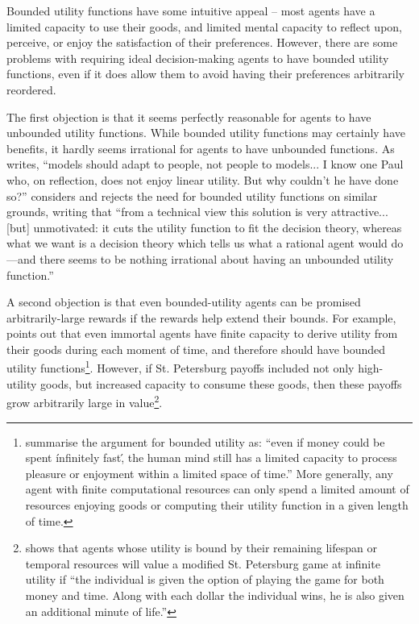 \documentclass{article}
\begin{document}
Bounded utility functions have some intuitive appeal -- most agents have a limited capacity to use their goods, and limited mental capacity to reflect upon, perceive, or enjoy the satisfaction of their preferences. However, there are some problems with requiring ideal decision-making agents to have bounded utility functions, even if it does allow them to avoid having their preferences arbitrarily reordered. 

The first objection is that it seems perfectly reasonable for agents to have unbounded utility functions. While bounded utility functions may certainly have benefits, it hardly seems irrational for agents to have unbounded functions. As \citep{samuelson1977st} writes, ``models should adapt to people, not people to models... I know one Paul who, on reflection, does not enjoy linear utility. But why couldn't he have done so?'' \citep{smith2014evaluative} considers and rejects the need for bounded utility functions on similar grounds, writing that ``from a technical view this solution is very attractive... [but] unmotivated: it cuts the utility function to fit the decision theory, whereas what we want is a decision theory which tells us what a rational agent would do—and there seems to be nothing irrational about having an unbounded utility function.''

A second objection is that even bounded-utility agents can be promised arbitrarily-large rewards if the rewards help extend their bounds. For example, \citep{brito1975becker} points out that even immortal agents have finite capacity to derive utility from their goods during each moment of time, and therefore should have bounded utility functions\footnote{\citep{cowen1988time} summarise the argument for bounded utility as: ``even if money could be spent \'infinitely fast\', the human mind still has a limited capacity to process pleasure or enjoyment within a limited space of time.'' More generally, any agent with finite computational resources can only spend a limited amount of resources enjoying goods or computing their utility function in a given length of time.}. However, if St. Petersburg payoffs included not only high-utility goods, but increased capacity to consume these goods, then these payoffs grow arbitrarily large in value\footnote{\citep{cowen1988time} shows that agents whose utility is bound by their remaining lifespan or temporal resources will value a modified St. Petersburg game at infinite utility if ``the individual is given the option of playing the game for both money and time. Along with each dollar the individual wins, he is also given an additional minute of life.''}. 
\end{document}
